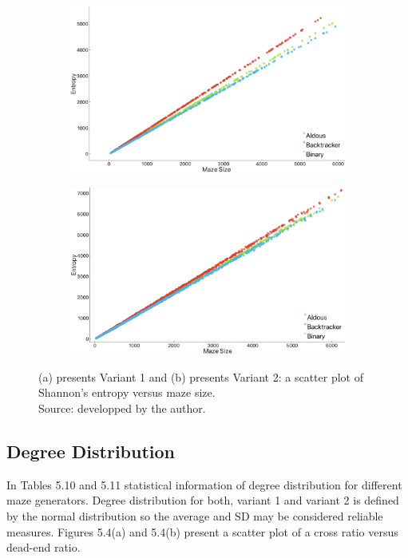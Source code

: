 \begin{figure}[!h]
    \centering
    \begin{subfigure}[!h]{0.7\textwidth}
       \includegraphics[width=0.9\linewidth]{entropy_variant1.png}
       \caption{}
    \end{subfigure}
    \begin{subfigure}[!h]{0.7\textwidth}
       \includegraphics[width=0.9\linewidth]{entropy_variant2.png}
       \caption{}
    \end{subfigure}
    \caption{(a) presents Variant 1 and (b) presents Variant 2: a scatter plot of Shannon's entropy versus maze size.\\Source: developped by the author.}
    \end{figure}%
 \newline   
\newpage
\subsection{Degree Distribution}  
In Tables 5.10 and 5.11 statistical information of degree distribution for different maze generators. Degree distribution for both, variant 1 and variant 2
is defined by the normal distribution so the average and SD may be considered reliable measures.
Figures 5.4(a) and 5.4(b) present a scatter plot of a cross ratio versus dead-end ratio.

